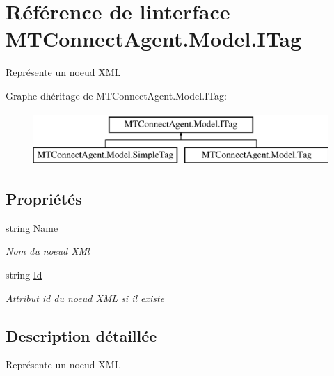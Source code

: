 \hypertarget{interface_m_t_connect_agent_1_1_model_1_1_i_tag}{}\section{Référence de l\textquotesingle{}interface M\+T\+Connect\+Agent.\+Model.\+I\+Tag}
\label{interface_m_t_connect_agent_1_1_model_1_1_i_tag}


Représente un noeud X\+ML  


Graphe d\textquotesingle{}héritage de M\+T\+Connect\+Agent.\+Model.\+I\+Tag\+:\begin{figure}[H]
\begin{center}
\leavevmode
\includegraphics[height=2.000000cm]{interface_m_t_connect_agent_1_1_model_1_1_i_tag}
\end{center}
\end{figure}
\subsection*{Propriétés}
\begin{DoxyCompactItemize}
\item 
string \mbox{\hyperlink{interface_m_t_connect_agent_1_1_model_1_1_i_tag_abb69a3ec05f4a38736a69571c13eb6e8}{Name}}
\begin{DoxyCompactList}\small\item\em Nom du noeud X\+Ml \end{DoxyCompactList}\item 
string \mbox{\hyperlink{interface_m_t_connect_agent_1_1_model_1_1_i_tag_a8f781ac29930451b3cb44b174cde3e4e}{Id}}
\begin{DoxyCompactList}\small\item\em Attribut id du noeud X\+ML si il existe \end{DoxyCompactList}\end{DoxyCompactItemize}


\subsection{Description détaillée}
Représente un noeud X\+ML 



